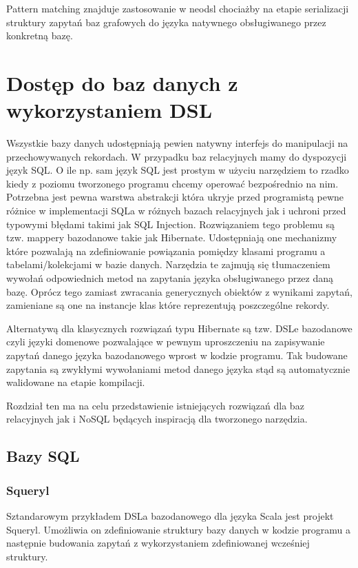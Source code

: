 \documentclass[brudnopis]{xmgr}
\begin{document}


Pattern matching znajduje zastosowanie w neodsl chociażby na etapie serializacji struktury zapytań baz grafowych do języka natywnego obsługiwanego przez konkretną bazę.

\chapter{Dostęp do baz danych z wykorzystaniem DSL}

Wszystkie bazy danych udostępniają pewien natywny interfejs do manipulacji na przechowywanych rekordach. W przypadku baz relacyjnych mamy do dyspozycji język SQL. O ile np. sam język SQL jest prostym w użyciu narzędziem to rzadko kiedy z poziomu tworzonego programu chcemy operować bezpośrednio na nim. Potrzebna jest pewna warstwa abstrakcji która ukryje przed programistą pewne różnice w implementacji SQLa w różnych bazach relacyjnych jak i uchroni przed typowymi błędami takimi jak SQL Injection. Rozwiązaniem tego problemu są tzw. mappery bazodanowe takie jak Hibernate. Udostępniają one mechanizmy które pozwalają na zdefiniowanie powiązania pomiędzy klasami programu a tabelami/kolekcjami w bazie danych. Narzędzia te zajmują się tłumaczeniem wywołań odpowiednich metod na zapytania języka obsługiwanego przez daną bazę. Oprócz tego zamiast zwracania generycznych obiektów z wynikami zapytań, zamieniane są one na instancje klas które reprezentują poszczególne rekordy.

Alternatywą dla klasycznych rozwiązań typu Hibernate są tzw. DSLe bazodanowe czyli języki domenowe pozwalające w pewnym uproszczeniu na zapisywanie zapytań danego języka bazodanowego wprost w kodzie programu. Tak budowane zapytania są zwykłymi wywołaniami metod danego języka stąd są automatycznie walidowane na etapie kompilacji.

Rozdział ten ma na celu przedstawienie istniejących rozwiązań dla baz relacyjnych jak i NoSQL będących inspiracją dla tworzonego narzędzia.

\section{Bazy SQL}

\subsection{Squeryl}

Sztandarowym przykładem DSLa bazodanowego dla języka Scala jest projekt Squeryl. Umożliwia on zdefiniowanie struktury bazy danych w kodzie programu a następnie budowania zapytań z wykorzystaniem zdefiniowanej wcześniej struktury.
\end{document}
